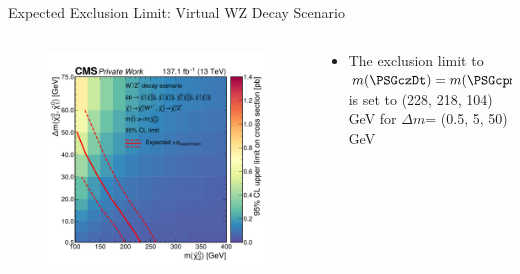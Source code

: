 \begin{frame}[fragile]{Expected Exclusion Limit: Virtual WZ Decay Scenario}
  \begin{columns}
    \begin{column}{0.5\textwidth}

      \begin{figure}[htpb]
        \centering
        \includegraphics[width=1.0\textwidth]{fig/exclusion-3d/Limit3D_wz.pdf}
      \end{figure}

    \end{column}
    \begin{column}{0.5\textwidth}
      \begin{itemize}
        \item The exclusion limit to \(m(\PSGczDt)=m(\PSGcpmDo)\) is set to (228, 218, 104) GeV for \(\Delta m\)= (0.5, 5, 50) GeV
      \end{itemize}
      
    \end{column}
  \end{columns}


\end{frame}


